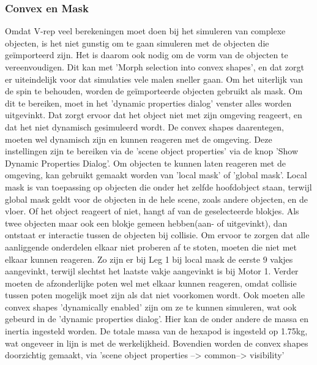 \documentclass[10pt,a4paper]{article}
\begin{document}
\subsubsection{Convex en Mask}
Omdat V-rep veel berekeningen moet doen bij het simuleren van complexe objecten, is het niet gunstig om te gaan simuleren met de objecten die ge\"importeerd zijn. Het is daarom ook nodig om de vorm van de objecten te vereenvoudigen. Dit kan met 'Morph selection into convex shapes', en dat zorgt er uiteindelijk voor dat simulaties vele malen sneller gaan. 
Om het uiterlijk van de spin te behouden, worden de ge\"importeerde objecten gebruikt als mask. Om dit te bereiken, moet in het 'dynamic properties dialog' venster alles worden uitgevinkt. Dat zorgt ervoor dat het object niet met zijn omgeving reageert, en dat het niet dynamisch gesimuleerd wordt.
De convex shapes daarentegen, moeten wel dynamisch zijn en kunnen reageren met de omgeving. Deze instellingen zijn te bereiken via de 'scene object properties' via de knop 'Show Dynamic Properties Dialog'. Om objecten te kunnen laten reageren met de omgeving, kan gebruikt gemaakt worden van 'local mask' of 'global mask'. Local mask is van toepassing op objecten die onder het zelfde hoofdobject staan, terwijl global mask geldt voor de objecten in de hele scene, zoals andere objecten, en de vloer. Of het object reageert of niet, hangt af van de geselecteerde blokjes. Als twee objecten maar ook een blokje gemeen hebben(aan- of uitgevinkt), dan ontstaat er interactie tussen de objecten bij collisie. Om ervoor te zorgen dat alle aanliggende onderdelen elkaar niet proberen af te stoten, moeten die niet met elkaar kunnen reageren. Zo zijn er bij Leg 1 bij local mask de eerste 9 vakjes aangevinkt, terwijl slechtst het laatste vakje aangevinkt is bij Motor 1.
Verder moeten de afzonderlijke poten wel met elkaar kunnen reageren, omdat collisie tussen poten mogelijk moet zijn als dat niet voorkomen wordt. 
Ook moeten alle convex shapes 'dynamically enabled' zijn om ze te kunnen simuleren, wat ook gebeurd in de 'dynamic properties dialog'. Hier kan de onder andere de massa en inertia ingesteld worden. De totale massa van de hexapod is ingesteld op 1.75kg, wat ongeveer in lijn is met de werkelijkheid.
Bovendien worden de convex shapes doorzichtig gemaakt, via 
'scene object properties --> common--> visibility'
\end{document}
